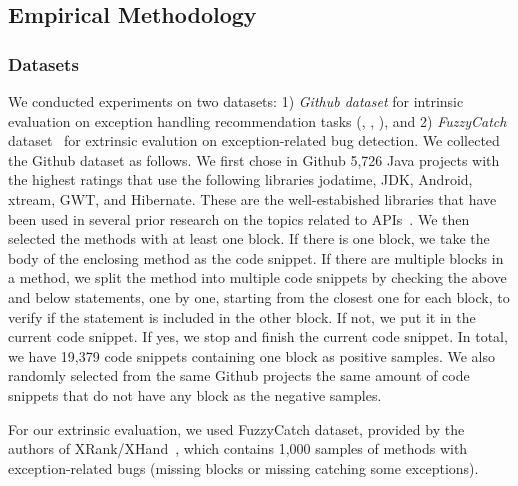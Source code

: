 \subsection{Empirical Methodology}

\subsubsection{Datasets}


We conducted experiments on two datasets: 1) {\em Github dataset}
for intrinsic evaluation on exception handling recommendation tasks
({\xblock}, {\xstate}, {\xtype}), and 2) {\em FuzzyCatch}
dataset~\cite{xrank-fse20} for extrinsic evalution on
exception-related bug detection.
%
%
We collected the Github dataset as follows. We first chose in Github
5,726 Java projects with the highest ratings that use
the following libraries jodatime, JDK, Android, xtream, GWT, and
Hibernate. These are the well-estabished libraries that have been used
in several prior research on the topics related to
APIs~\cite{icse18,liveapi14}. We then selected the methods with at
least one  block. If there is one 
block, we take the body of the enclosing method as the code
snippet. If there are multiple  blocks in a method, we
split the method into multiple code snippets by checking the above and
below statements, one by one, starting from the closest one for each
 block, to verify if the statement is included in the
other block. If not, we put it in the current code snippet. If yes, we
stop and finish the current code snippet. In total, we have
19,379 code snippets containing one
 block as positive samples. We also randomly selected
from the same Github projects the same amount of code snippets that do
not have any  block as the negative samples.

For our extrinsic evaluation, we used FuzzyCatch dataset, provided by
the authors of XRank/XHand~\cite{xrank-fse20}, which contains 1,000
samples of methods with exception-related bugs (missing
 blocks or missing catching some exceptions).


